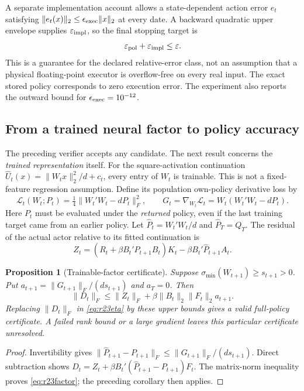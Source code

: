 \documentclass[ecta,nameyear,draft]{econsocart}
\newtheorem{proposition}[theorem]{Proposition}
\theoremstyle{definition}
\theoremstyle{remark}
\begin{document}
A separate implementation account allows a state-dependent action error
$e_t$ satisfying $\|e_t(x)\|_2\leq\epsilon_{\rm exec}\|x\|_2$ at every
date. A backward quadratic upper envelope supplies
$\varepsilon_{\rm impl}$, so the final stopping target is
\begin{equation}
 \varepsilon_{\rm pol}+\varepsilon_{\rm impl}\leq\varepsilon.
 \label{eq:r23stop}
\end{equation}
This is a guarantee for the declared relative-error class, not an assumption
that a physical floating-point executor is overflow-free on every real input.
The exact stored policy corresponds to zero execution error. The experiment
also reports the outward bound for $\epsilon_{\rm exec}=10^{-12}$.

\subsection{From a trained neural factor to policy accuracy}
The preceding verifier accepts any candidate. The next result concerns the
\emph{trained representation} itself. For the square-activation continuation
$\widehat U_t(x)=\|W_tx\|_2^2/d+c_t$, every entry of $W_t$ is trainable.
This is not a fixed-feature regression assumption. Define its population
own-policy derivative loss by
\[
 \mathcal L_t(W_t;P_t)=\tfrac14\|W_t'W_t-dP_t\|_F^2,
 \qquad G_t=\nabla_{W_t}\mathcal L_t=W_t(W_t'W_t-dP_t).
\]
Here $P_t$ must be evaluated under the \emph{returned} policy, even if the
last training target came from an earlier policy. Let
$\widehat P_t=W_t'W_t/d$ and $\widehat P_T=Q_T$. The residual of the actual
actor relative to its fitted continuation is
\[
 Z_t=(R_t+\beta B_t'\widehat P_{t+1}B_t)K_t
                   -\beta B_t'\widehat P_{t+1}A_t.
\]

\begin{proposition}[Trainable-factor certificate]\label{prop:r23factor}
Suppose $\sigma_{\min}(W_{t+1})\geq s_{t+1}>0$. Put
$a_{t+1}=\|G_{t+1}\|_F/(ds_{t+1})$ and $a_T=0$. Then
\begin{equation}
 \|D_t\|_F\leq\|Z_t\|_F+
       \beta\|B_t\|_2\|F_t\|_2 a_{t+1}.
 \label{eq:r23factor}
\end{equation}
Replacing $\|D_t\|_F$ in \eqref{eq:r23eta} by these upper bounds gives a
valid full-policy certificate. A failed rank bound or a large gradient
leaves this particular certificate unresolved.
\end{proposition}
\begin{proof}
Invertibility gives
$\|\widehat P_{t+1}-P_{t+1}\|_F
\leq\|G_{t+1}\|_F/(ds_{t+1})$. Direct subtraction shows
$D_t=Z_t+\beta B_t'(\widehat P_{t+1}-P_{t+1})F_t$.
The matrix-norm inequality proves \eqref{eq:r23factor}; the preceding
corollary then applies.
\end{proof}
\end{document}
